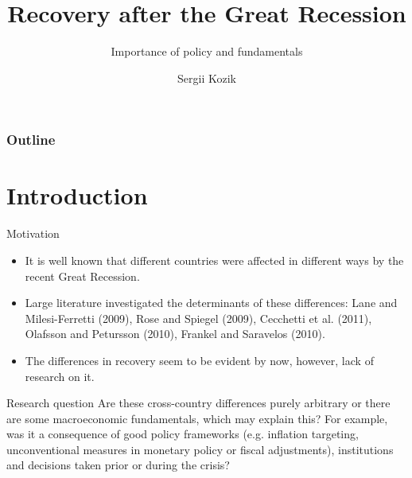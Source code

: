 \documentclass[xcolor=dvipsnames]{beamer}
\author{Sergii Kozik}
\title{Recovery after the Great Recession}
\subtitle{Importance of policy and fundamentals}
\institute{Heriot-Watt University}
\begin{document}
\begin{frame}
\titlepage
\end{frame}

\begin{frame}
\frametitle{Outline}
\tableofcontents{}
\end{frame}

\section{Introduction}
\begin{frame}{Motivation}
\begin{itemize}
\item It is well known that different countries were affected in different ways by the recent Great Recession.
\item Large literature investigated the determinants of these differences: Lane and Milesi-Ferretti (2009), Rose and Spiegel (2009), Cecchetti et al. (2011), Olafsson and Petursson (2010), Frankel and Saravelos (2010).
\item The differences in recovery seem to be evident by now, however, lack of research on it.
\end{itemize}
\end{frame}
\begin{frame}{Research question}
Are these cross-country differences purely arbitrary or there are some macroeconomic fundamentals, which may explain this? For example, was it a consequence of good policy frameworks (e.g. inflation targeting, unconventional measures in monetary policy or fiscal adjustments), institutions and decisions taken prior or during the crisis?
\end{frame}
\end{document}
